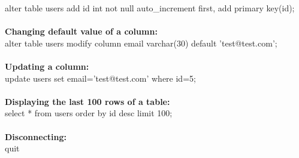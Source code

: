 \documentclass[11pt]{article}
\begin{document}
alter table users add id int not null auto\_increment first, add primary key(id);\\
\\
\textbf{Changing default value of a column:\\}
alter table users modify column email varchar(30) default 'test@test.com';\\
\\
\textbf{Updating a column:\\}
update users set email='test@test.com' where id=5;\\
\\
\textbf{Displaying the last 100 rows of a table:\\}
select * from users order by id desc limit 100;\\
\\
\textbf{Disconnecting:\\}
quit
\end{document}
